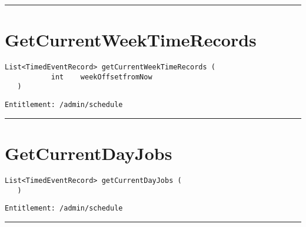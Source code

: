 \rule{12cm}{2pt}
\section{GetCurrentWeekTimeRecords}
\label{Api:GetCurrentWeekTimeRecords}
\begin{lstlisting}[style=nonumbers]
   List<TimedEventRecord> getCurrentWeekTimeRecords (
           int    weekOffsetfromNow
   )
\end{lstlisting}
\begin{Verbatim}[formatcom=\color{Maroon}]
  Entitlement: /admin/schedule
\end{Verbatim}



\rule{12cm}{2pt}
\section{GetCurrentDayJobs}
\label{Api:GetCurrentDayJobs}
\begin{lstlisting}[style=nonumbers]
   List<TimedEventRecord> getCurrentDayJobs (
   )
\end{lstlisting}
\begin{Verbatim}[formatcom=\color{Maroon}]
  Entitlement: /admin/schedule
\end{Verbatim}



\rule{12cm}{2pt}
